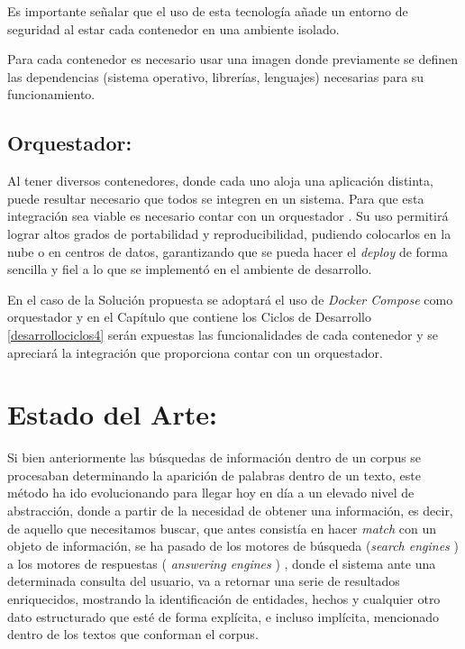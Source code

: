 \documentclass[
  12pt,
  openany]{book}
\begin{document}
Es importante señalar que el uso de esta tecnología añade un entorno de seguridad al estar cada contenedor en una ambiente isolado.

Para cada contenedor es necesario usar una imagen donde previamente se definen las dependencias (sistema operativo, librerías, lenguajes) necesarias para su funcionamiento.

\hypertarget{orquestador}{%
\subsection{Orquestador:}\label{orquestador}}

Al tener diversos contenedores, donde cada uno aloja una aplicación distinta, puede resultar necesario que todos se integren en un sistema. Para que esta integración sea viable es necesario contar con un orquestador \citep{cook2017}. Su uso permitirá lograr altos grados de portabilidad y reproducibilidad, pudiendo colocarlos en la nube o en centros de datos, garantizando que se pueda hacer el \emph{deploy} de forma sencilla y fiel a lo que se implementó en el ambiente de desarrollo.

En el caso de la Solución propuesta se adoptará el uso de \emph{Docker Compose} como orquestador y en el Capítulo que contiene los Ciclos de Desarrollo \ref{desarrollociclos4} serán expuestas las funcionalidades de cada contenedor y se apreciará la integración que proporciona contar con un orquestador.

\hypertarget{sota}{%
\section{Estado del Arte:}\label{sota}}

Si bien anteriormente las búsquedas de información dentro de un corpus se procesaban determinando la aparición de palabras dentro de un texto, este método ha ido evolucionando para llegar hoy en día a un elevado nivel de abstracción, donde a partir de la necesidad de obtener una información, es decir, de aquello que necesitamos buscar, que antes consistía en hacer \emph{match} con un objeto de información, se ha pasado de los motores de búsqueda (\emph{search engines} ) a los motores de respuestas ( \emph{answering engines} ) \citep{balog2018}, donde el sistema ante una determinada consulta del usuario, va a retornar una serie de resultados enriquecidos, mostrando la identificación de entidades, hechos y cualquier otro dato estructurado que esté de forma explícita, e incluso implícita, mencionado dentro de los textos que conforman el corpus.
\end{document}

